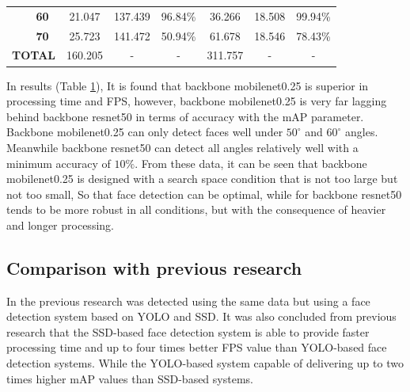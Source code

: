 \begin{table}[pt]
{\begin{tabular}{|c|c|c|c|c|c|c|c|}
    \cline{2-8}
                                      & \textbf{60}       & 21.047                                                                     & 137.439      & 96.84\%      & 36.266                                                                                       & 18.508       & 99.94\%       \\ 
    \cline{2-8}
                                      & \textbf{70}       & 25.723                                                                     & 141.472      & 50.94\%      & 61.678                                                                                       & 18.546       & 78.43\%       \\ 
    \hline
    \multicolumn{2}{|l|}{\textbf{TOTAL}}                  & 160.205                                                                    & -            & -            & 311.757                                                                                      & -            & -             \\
    \hline
    \end{tabular}}
  \label{table:pendeteksianberdasarkansudut}
\end{table}

In results (Table \ref{table:pendeteksianberdasarkansudut}), It is found that backbone mobilenet0.25 is superior in processing time and FPS, however, backbone mobilenet0.25 is very far
lagging behind backbone resnet50 in terms of accuracy with the mAP parameter. Backbone mobilenet0.25 can only detect faces well under $50^\circ$ and $60^\circ$ angles.
Meanwhile backbone resnet50 can detect all angles relatively well with a minimum accuracy of $10\%$. From these data, it can be seen that backbone mobilenet0.25 is designed with a search space condition that is not too large but not too small,
So that face detection can be optimal, while for backbone resnet50 tends to be more robust in all conditions, but with the consequence of heavier and longer processing.

\subsection{Comparison with previous research}

In the previous research \citep{nugrohoevalution2016} was detected using the same data but using a face detection system based on YOLO and SSD.
It was also concluded from previous research that the SSD-based face detection system is able to provide
faster processing time and up to four times better FPS value than YOLO-based face detection systems. While the YOLO-based system
capable of delivering up to two times higher mAP values than SSD-based systems.

